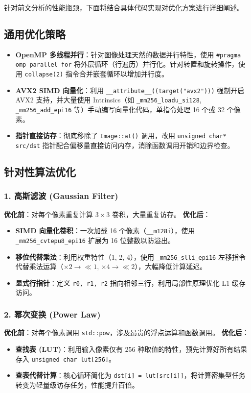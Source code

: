 \documentclass[a4paper]{article}
\begin{document}
针对前文分析的性能瓶颈，下面将结合具体代码实现对优化方案进行详细阐述。

\subsection{通用优化策略}
\begin{itemize}
    \item \textbf{OpenMP 多线程并行}：针对图像处理天然的数据并行特性，使用 \texttt{\#pragma omp parallel for} 将外层循环（行遍历）并行化。针对转置和旋转操作，使用 \texttt{collapse(2)} 指令合并嵌套循环以增加并行度。
    \item \textbf{AVX2 SIMD 向量化}：利用 \texttt{\_\_attribute\_\_((target("avx2")))} 强制开启 AVX2 支持，并大量使用 Intrinsics（如 \texttt{\_mm256\_loadu\_si128}, \texttt{\_mm256\_add\_epi16} 等）手动编写向量化代码，单指令处理 16 个或 32 个像素。
    \item \textbf{指针直接访存}：彻底移除了 \texttt{Image::at()} 调用，改用 \texttt{unsigned char* src/dst} 指针配合偏移量直接访问内存，消除函数调用开销和边界检查。
\end{itemize}

\subsection{针对性算法优化}

\subsubsection{1. 高斯滤波 (Gaussian Filter)}
\textbf{优化前}：对每个像素重复计算 $3 \times 3$ 卷积，大量重复访存。
\textbf{优化后}：
\begin{itemize}
    \item \textbf{SIMD 向量化卷积}：一次加载 16 个像素（\texttt{\_\_m128i}），使用 \texttt{\_mm256\_cvtepu8\_epi16} 扩展为 16 位整数以防溢出。
    \item \textbf{移位代替乘法}：利用权重特性（1, 2, 4），使用 \texttt{\_mm256\_slli\_epi16} 左移指令代替乘法运算（$\times 2 \to \ll 1$, $\times 4 \to \ll 2$），大幅降低计算延迟。
    \item \textbf{显式行指针}：定义 \texttt{r0, r1, r2} 指向相邻三行，利用局部性原理优化 L1 缓存访问。
\end{itemize}

\subsubsection{2. 幂次变换 (Power Law)}
\textbf{优化前}：对每个像素调用 \texttt{std::pow}，涉及昂贵的浮点运算和函数调用。
\textbf{优化后}：
\begin{itemize}
    \item \textbf{查找表 (LUT)}：利用输入像素仅有 256 种取值的特性，预先计算好所有结果存入 \texttt{unsigned char lut[256]}。
    \item \textbf{查表代替计算}：核心循环简化为 \texttt{dst[i] = lut[src[i]]}，将计算密集型任务转变为轻量级访存任务，性能提升百倍。
\end{itemize}
\end{document}
